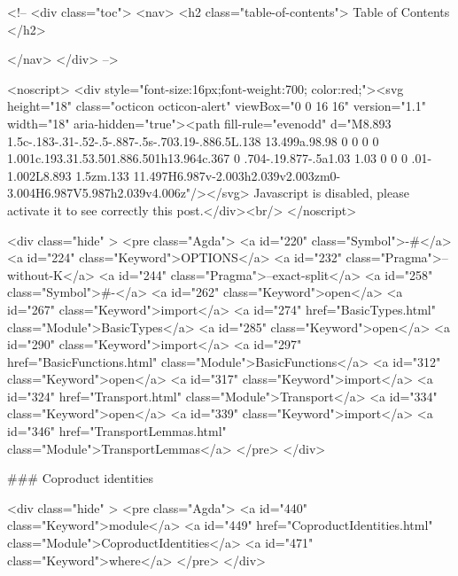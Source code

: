   <!-- 
  <div class="toc">
    <nav>
    <h2 class="table-of-contents"> Table of Contents </h2>
      

    </nav>
  </div>
   -->

  <noscript>
  <div style="font-size:16px;font-weight:700; color:red;"><svg height="18" class="octicon octicon-alert" viewBox="0 0 16 16" version="1.1" width="18" aria-hidden="true"><path fill-rule="evenodd" d="M8.893 1.5c-.183-.31-.52-.5-.887-.5s-.703.19-.886.5L.138 13.499a.98.98 0 0 0 0 1.001c.193.31.53.501.886.501h13.964c.367 0 .704-.19.877-.5a1.03 1.03 0 0 0 .01-1.002L8.893 1.5zm.133 11.497H6.987v-2.003h2.039v2.003zm0-3.004H6.987V5.987h2.039v4.006z"/></svg> Javascript is disabled, please activate it to see correctly this post.</div><br/>
  </noscript>

  <div class="hide" >
<pre class="Agda">
<a id="220" class="Symbol">{-#</a> <a id="224" class="Keyword">OPTIONS</a> <a id="232" class="Pragma">--without-K</a> <a id="244" class="Pragma">--exact-split</a> <a id="258" class="Symbol">#-}</a>
<a id="262" class="Keyword">open</a> <a id="267" class="Keyword">import</a> <a id="274" href="BasicTypes.html" class="Module">BasicTypes</a>
<a id="285" class="Keyword">open</a> <a id="290" class="Keyword">import</a> <a id="297" href="BasicFunctions.html" class="Module">BasicFunctions</a>
<a id="312" class="Keyword">open</a> <a id="317" class="Keyword">import</a> <a id="324" href="Transport.html" class="Module">Transport</a>
<a id="334" class="Keyword">open</a> <a id="339" class="Keyword">import</a> <a id="346" href="TransportLemmas.html" class="Module">TransportLemmas</a>
</pre>
</div>

### Coproduct identities

<div class="hide" >
<pre class="Agda">
<a id="440" class="Keyword">module</a>
  <a id="449" href="CoproductIdentities.html" class="Module">CoproductIdentities</a>
  <a id="471" class="Keyword">where</a>
</pre>
</div>

